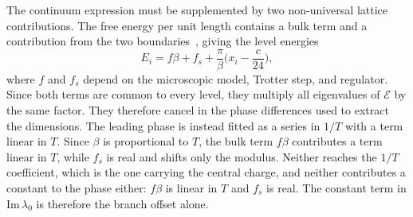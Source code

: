 The continuum expression must be supplemented by two non-universal lattice contributions. The free energy per unit length contains a bulk term and a contribution from the two boundaries~\cite{blote_cardy_nightingale1986}, giving the level energies
\begin{equation}
  E_i = f\beta + f_s + \frac{\pi}{\beta}\Big(x_i - \frac{c}{24}\Big),
  \label{eq:cft:levels}
\end{equation}
where $f$ and $f_s$ depend on the microscopic model, Trotter step, and regulator. Since both terms are common to every level, they multiply all eigenvalues of $\mathcal{E}$ by the same factor. They therefore cancel in the phase differences used to extract the dimensions. The leading phase is instead fitted as a series in $1/T$ with a term linear in $T$. Since $\beta$ is proportional to $T$, the bulk term $f\beta$ contributes a term linear in $T$, while $f_s$ is real and shifts only the modulus. Neither reaches the $1/T$ coefficient, which is the one carrying the central charge, and neither contributes a constant to the phase either: $f\beta$ is linear in $T$ and $f_s$ is real. The constant term in $\mathrm{Im}\,\lambda_0$ is therefore the branch offset alone.

